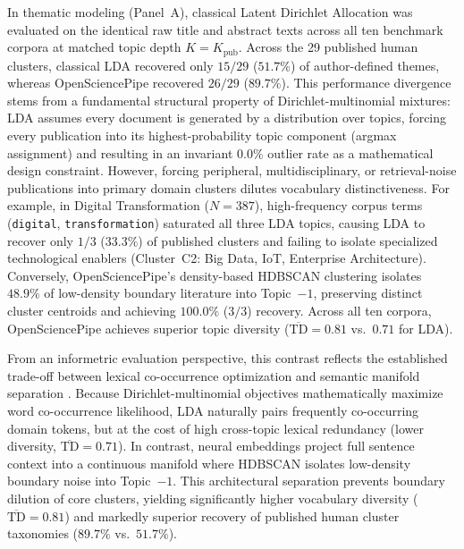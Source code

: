 \documentclass[preprint,12pt]{elsarticle}
\begin{document}


In thematic modeling (Panel~A), classical Latent Dirichlet Allocation \cite{blei2003latent} was evaluated on the identical raw title and abstract texts across all ten benchmark corpora at matched topic depth $K = K_{\text{pub}}$. Across the 29 published human clusters, classical LDA recovered only $15/29$ ($51.7\%$) of author-defined themes, whereas OpenSciencePipe recovered $26/29$ ($89.7\%$). This performance divergence stems from a fundamental structural property of Dirichlet-multinomial mixtures: LDA assumes every document is generated by a distribution over topics, forcing every publication into its highest-probability topic component (argmax assignment) and resulting in an invariant $0.0\%$ outlier rate as a mathematical design constraint. However, forcing peripheral, multidisciplinary, or retrieval-noise publications into primary domain clusters dilutes vocabulary distinctiveness. For example, in Digital Transformation ($N = 387$), high-frequency corpus terms (\texttt{digital}, \texttt{transformation}) saturated all three LDA topics, causing LDA to recover only $1/3$ ($33.3\%$) of published clusters and failing to isolate specialized technological enablers (Cluster~C2: Big Data, IoT, Enterprise Architecture). Conversely, OpenSciencePipe's density-based HDBSCAN clustering isolates $48.9\%$ of low-density boundary literature into Topic~$-1$, preserving distinct cluster centroids and achieving $100.0\%$ ($3/3$) recovery. Across all ten corpora, OpenSciencePipe achieves superior topic diversity ($\overline{\text{TD}} = 0.81$ vs.\ $0.71$ for LDA).

From an informetric evaluation perspective, this contrast reflects the established trade-off between lexical co-occurrence optimization and semantic manifold separation \cite{dieng2020topic, hoyle2021automated}. Because Dirichlet-multinomial objectives mathematically maximize word co-occurrence likelihood, LDA naturally pairs frequently co-occurring domain tokens, but at the cost of high cross-topic lexical redundancy (lower diversity, $\overline{\text{TD}} = 0.71$). In contrast, neural embeddings project full sentence context into a continuous manifold where HDBSCAN isolates low-density boundary noise into Topic~$-1$. This architectural separation prevents boundary dilution of core clusters, yielding significantly higher vocabulary diversity ($\overline{\text{TD}} = 0.81$) and markedly superior recovery of published human cluster taxonomies ($89.7\%$ vs.\ $51.7\%$).
\end{document}

